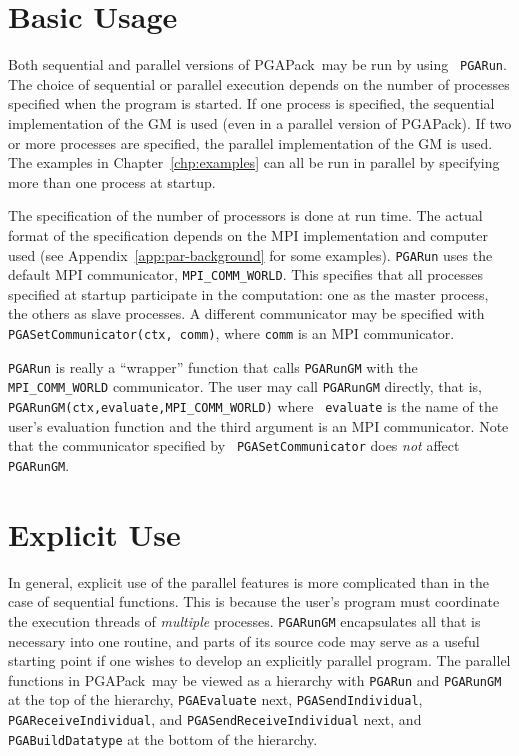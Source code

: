 \documentclass{report}
\newcommand{\pga}{PGAPack}
\begin{document}
\section{Basic Usage}\label{sec:par-basic-usage}

Both sequential and parallel versions of \pga\ may be run by using {\tt
PGARun}.  The choice of sequential or parallel execution depends on the number
of processes specified when the program is started.  If one process is
specified, the sequential implementation of the GM is used (even in a parallel
version of
\pga).  If two or more processes are specified, the parallel implementation of
the GM is used.  The examples in Chapter~\ref{chp:examples} can all be run in
parallel by specifying more than one process at startup.

The specification of the number of processors is done at run time.  The actual
format of the specification depends on the MPI implementation and computer
used (see Appendix~\ref{app:par-background} for some examples).  {\tt PGARun}
uses the default MPI communicator, {\tt MPI\_COMM\_WORLD}.  This specifies
that all processes specified at startup participate in the computation: one as
the master process, the others as slave processes.  A different communicator
may be specified with {\tt PGASetCommunicator(ctx, comm)}, where {\tt comm} is
an MPI communicator.

{\tt PGARun} is really a ``wrapper'' function that calls {\tt PGARunGM} with
the {\tt MPI\_COMM\_WORLD} communicator.  The user may call {\tt PGARunGM}
directly, that is, {\tt PGARunGM(ctx,evaluate,MPI\_COMM\_WORLD)} where {\tt
evaluate} is the name of the user's evaluation function and the third argument
is an MPI communicator.  Note that the communicator specified by {\tt
PGASetCommunicator} does {\em not} affect {\tt PGARunGM}.

\section{Explicit Use}\label{sec:par-explicit-usage}

In general, explicit use of the parallel features is more complicated than in
the case of sequential functions.  This is because the user's program must
coordinate the execution threads of {\em multiple} processes.  {\tt PGARunGM}
encapsulates all that is necessary into one routine, and parts of its source
code may serve as a useful starting point if one wishes to develop an
explicitly parallel program.  The parallel functions in \pga\ may be viewed as
a hierarchy with {\tt PGARun} and {\tt PGARunGM} at the top of the hierarchy,
{\tt PGAEvaluate} next, {\tt PGASendIndividual}, {\tt PGAReceiveIndividual},
and {\tt PGASendReceiveIndividual} next, and {\tt PGABuildDatatype} at the
bottom of the hierarchy.
\end{document}
